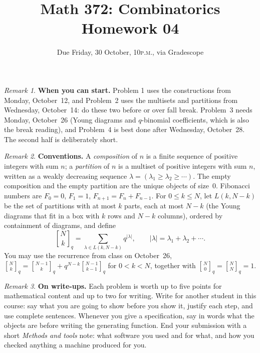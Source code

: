 \documentclass[11pt,twoside]{amsart}
\title{Math 372: Combinatorics\\ Homework 04}
\author{Due Friday, 30 October, 10\textsc{p.m.}, via Gradescope}
\theoremstyle{plain}
\theoremstyle{remark}
\newtheorem*{rmk*}{Remark}
\theoremstyle{definition}
\newcommand{\qbinom}[2]{\genfrac{[}{]}{0pt}{}{#1}{#2}_{\!q}}
\begin{document}
\maketitle

\begin{rmk*}
\textbf{When you can start.} Problem 1 uses the constructions from Monday, October~12, and
Problem~2 uses the multisets and partitions from Wednesday, October~14: do these two before or
over fall break. Problem~3 needs Monday, October~26 (Young diagrams and $q$-binomial
coefficients, which is also the break reading), and Problem~4 is best done after Wednesday,
October~28. The second half is deliberately short.
\end{rmk*}

\begin{rmk*}
\textbf{Conventions.} A \emph{composition} of $n$ is a finite sequence of positive integers
with sum $n$; a \emph{partition} of $n$ is a multiset of positive integers with sum $n$, written
as a weakly decreasing sequence $\lambda=(\lambda_1\ge\lambda_2\ge\cdots)$. The empty
composition and the empty partition are the unique objects of size~$0$. Fibonacci numbers are
$F_0=0$, $F_1=1$, $F_{n+1}=F_n+F_{n-1}$. For $0\le k\le N$, let $L(k,N-k)$ be the set of
partitions with at most $k$ parts, each at most $N-k$ (the Young diagrams that fit in a box with
$k$ rows and $N-k$ columns), ordered by containment of diagrams, and define
\[
\qbinom Nk=\sum_{\lambda\in L(k,N-k)}q^{|\lambda|},\qquad |\lambda|=\lambda_1+\lambda_2+\cdots.
\]
You may use the recurrence from class on October~26,
$\qbinom Nk=\qbinom{N-1}{k}+q^{N-k}\qbinom{N-1}{k-1}$ for $0<k<N$, together with
$\qbinom N0=\qbinom NN=1$.
\end{rmk*}

\begin{rmk*}
\textbf{On write-ups.} Each problem is worth up to five points for mathematical content and up to
two for writing. Write for another student in this course: say what you are going to show before
you show it, justify each step, and use complete sentences. Whenever you give a specification,
say in words what the objects are before writing the generating function. End your submission
with a short \emph{Methods and tools} note: what software you used and for what, and how you
checked anything a machine produced for you.
\end{rmk*}
\end{document}
